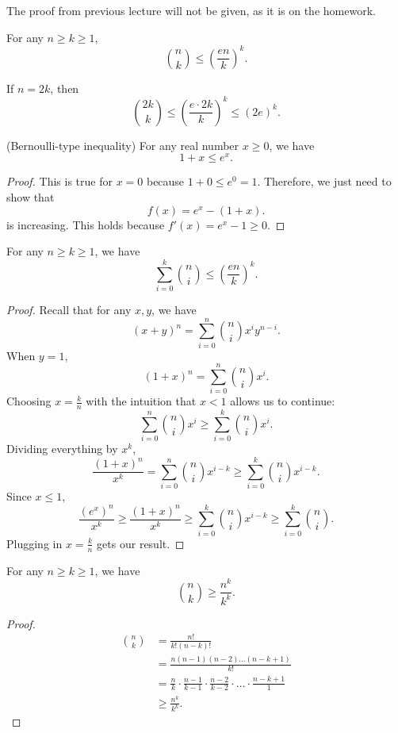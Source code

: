 
The proof from previous lecture will not be given, as it is on the homework.

\begin{lemma}
	For any \( n\ge k\ge 1 \), \[
		\binom{n}{k} \le \left( \frac{en}{k} \right) ^{k} 
	.\] 
\end{lemma}

\begin{observation}
	If \( n=2k \), then \[
		\binom{2k}{k} \le \left( \frac{e\cdot 2k}{k} \right)^{k}  \le (2e)^{k} 
	.\] 
\end{observation}

\begin{lemma}
	(Bernoulli-type inequality) For any real number \( x\ge 0 \), we have \[
		1 + x \le e^{x} 
	.\] 
\end{lemma}
\begin{proof}
	This is true for \( x=0 \) because \( 1 + 0 \le e^{0} = 1 \). Therefore, we just need to show that \[
		f(x) = e^{x} - (1+x) 
	.\] is increasing. This holds because \( f'(x) = e^{x}-1\ge 0  \).
\end{proof}

\begin{lemma}
	For any \( n\ge k\ge 1 \), we have \[
		\sum_{i=0}^{k} \binom{n}{i}\le \left( \frac{en}{k}  \right) ^{k} 
	.\]
\end{lemma}
\begin{proof}
	Recall that for any \( x,y \), we have \[
		(x+y)^{n} = \sum_{i=0}^{n} \binom{n}{i}x^{i}y^{n-i}  
	.\] When \( y = 1 \), \[
		(1+x)^{n} = \sum_{i=0}^{n} \binom{n}{i}x^{i}  
	.\] Choosing \( x=\frac{k}{n} \) with the intuition that \( x < 1 \) allows us to continue:
	\[
		\sum_{i=0}^{n} \binom{n}{i}x^{i}\ge \sum_{i=0}^{k} \binom{n}{i}x^{i}  
	.\] Dividing everything by \( x^{k}  \), \[
		\frac{(1+x)^{n} }{x^{k} } = \sum_{i=0}^{n} \binom{n}{i}x^{i-k} \ge \sum_{i=0}^{k} \binom{n}{i}x^{i-k} 
	.\] Since \( x \le 1 \), \[
	\frac{(e^{x})^{n}  }{x^{k}  } \ge  \frac{(1+x)^{n} }{x^k } \ge \sum_{i=0}^{k} \binom{n}{i}x^{i-k} \ge \sum_{i=0}^{k} \binom{n}{i} 
	.\] Plugging in \( x = \frac{k}{n} \) gets our result.
\end{proof}

\begin{lemma}
	For any \( n\ge k\ge 1 \), we have \[
		\binom{n}{k} \ge \frac{n^{k}}{k^{k} } 
	.\] 
\end{lemma}
\begin{proof}
	\begin{align*}
		\binom{n}{k} &= \frac{n!}{k!(n-k)!} \\
		&= \frac{n(n-1)(n-2)\ldots (n-k+1)}{k!} \\
		&= \frac{n}{k}\cdot \frac{n-1}{k-1} \cdot \frac{n-2}{k-2} \cdot \ldots \cdot  \frac{n-k+1}{1} \\
		&\ge \frac{n^{k}}{k^{k} }
	.\end{align*}
\end{proof}


